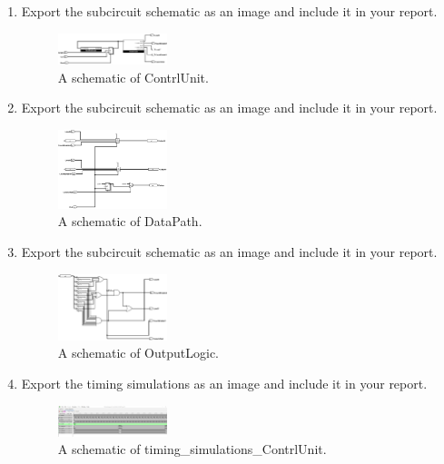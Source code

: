 \documentclass{article}
\begin{document}
\begin{enumerate}
\item Export the subcircuit schematic as an image and include it in your report.

\begin{figure}[ht!]
    \centering
    \includegraphics[width=0.3\textwidth]{ContrlUnit.png}
    \caption{A schematic of ContrlUnit.}
    \label{f:part2_ContrlUnit}
\end{figure}

\item Export the subcircuit schematic as an image and include it in your report.

\begin{figure}[ht!]
    \centering
    \includegraphics[width=0.3\textwidth]{DataPath.png}
    \caption{A schematic of DataPath.}
    \label{f:part2_DataPath}
\end{figure}

\item Export the subcircuit schematic as an image and include it in your report.

\begin{figure}[ht!]
    \centering
    \includegraphics[width=0.3\textwidth]{OutputLogic.png}
    \caption{A schematic of OutputLogic.}
    \label{f:part2_OutputLogic}
\end{figure}

\item Export the timing simulations as an image and include it in your report.

\begin{figure}[ht!]
    \centering
    \includegraphics[width=0.3\textwidth]{timing_simulations_ContrlUnit.png}
    \caption{A schematic of timing_simulations_ContrlUnit.}
    \label{f:part2_timing_simulations_ContrlUnit}
\end{figure}


\end{enumerate}
\end{document}

